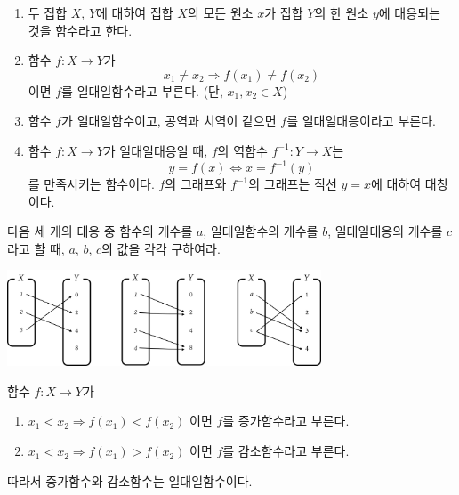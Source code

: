 \documentclass{oblivoir}
\begin{document}
\newpage
\begin{mdframed}
%
\begin{enumerate}\label{review3}
\item
두 집합 \(X\), \(Y\)에 대하여 집합 \(X\)의 모든 원소 \(x\)가 집합 \(Y\)의 한 원소 \(y\)에 대응되는 것을 함수라고 한다.%
\item
함수 \(f:X\to Y\)가
\[x_1\neq x_2\Longrightarrow f(x_1)\neq f(x_2)\]
이면 \(f\)를 일대일함수라고 부른다.
(단, \(x_1,x_2\in X\))
\item
함수 \(f\)가 일대일함수이고,  공역과 치역이 같으면 \(f\)를 일대일대응이라고 부른다.
\item
함수 \(f:X\to Y\)가 일대일대응일 때, \(f\)의 역함수 \(f^{-1}:Y\to X\)는
\[y=f(x)\iff x=f^{-1}(y)\]
를 만족시키는 함수이다.
\(f\)의 그래프와 \(f^{-1}\)의 그래프는 직선 \(y=x\)에 대하여 대칭이다.
\end{enumerate}
\end{mdframed}

%
\prob{}\label{review4}
다음  세 개의 대응 중 함수의 개수를 \(a\), 일대일함수의 개수를 \(b\),  일대일대응의 개수를 \(c\)라고 할 때, \(a\), \(b\), \(c\)의 값을 각각 구하여라.
\bigskip
\bigskip
\begin{center}
\includegraphics[width=0.7\textwidth]{review_4}
\end{center}

\newpage
\begin{mdframed}
%
\label{review5}
함수 \(f:X\to Y\)가
\begin{enumerate}
\item
\(x_1<x_2\Longrightarrow f(x_1)<f(x_2)\)
이면 \(f\)를 증가함수라고 부른다.
\item
\(x_1<x_2\Longrightarrow f(x_1)>f(x_2)\)
이면 \(f\)를 감소함수라고 부른다.
\end{enumerate}
\end{mdframed}
따라서 증가함수와 감소함수는 일대일함수이다.
\end{document}
